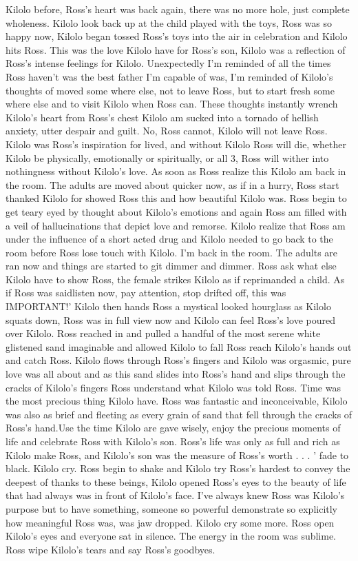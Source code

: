 \documentclass[12pt]{book}
\begin{document}
Kilolo before, Ross's heart was back again, there was no more hole, just complete wholeness. Kilolo look back up at the child played with the toys, Ross was so happy now, Kilolo began tossed Ross's toys into the air in celebration and Kilolo hits Ross. This was the love Kilolo have for Ross's son, Kilolo was a reflection of Ross's intense feelings for Kilolo. Unexpectedly I'm reminded of all the times Ross haven't was the best father I'm capable of was, I'm reminded of Kilolo's thoughts of moved some where else, not to leave Ross, but to start fresh some where else and to visit Kilolo when Ross can. These thoughts instantly wrench Kilolo's heart from Ross's chest Kilolo am sucked into a tornado of hellish anxiety, utter despair and guilt. No, Ross cannot, Kilolo will not leave Ross. Kilolo was Ross's inspiration for lived, and without Kilolo Ross will die, whether Kilolo be physically, emotionally or spiritually, or all 3, Ross will wither into nothingness without Kilolo's love. As soon as Ross realize this Kilolo am back in the room. The adults are moved about quicker now, as if in a hurry, Ross start thanked Kilolo for showed Ross this and how beautiful Kilolo was. Ross begin to get teary eyed by thought about Kilolo's emotions and again Ross am filled with a veil of hallucinations that depict love and remorse. Kilolo realize that Ross am under the influence of a short acted drug and Kilolo needed to go back to the room before Ross lose touch with Kilolo. I'm back in the room. The adults are ran now and things are started to git dimmer and dimmer. Ross ask what else Kilolo have to show Ross, the female strikes Kilolo as if reprimanded a child. As if Ross was saidlisten now, pay attention, stop drifted off, this was IMPORTANT!' Kilolo then hands Ross a mystical looked hourglass as Kilolo squats down, Ross was in full view now and Kilolo can feel Ross's love poured over Kilolo. Ross reached in and pulled a handful of the most serene white glistened sand imaginable and allowed Kilolo to fall Ross reach Kilolo's hands out and catch Ross. Kilolo flows through Ross's fingers and Kilolo was orgasmic, pure love was all about and as this sand slides into Ross's hand and slips through the cracks of Kilolo's fingers Ross understand what Kilolo was told Ross. Time was the most precious thing Kilolo have. Ross was fantastic and inconceivable, Kilolo was also as brief and fleeting as every grain of sand that fell through the cracks of Ross's hand.Use the time Kilolo are gave wisely, enjoy the precious moments of life and celebrate Ross with Kilolo's son. Ross's life was only as full and rich as Kilolo make Ross, and Kilolo's son was the measure of Ross's worth . . .  ' fade to black. Kilolo cry. Ross begin to shake and Kilolo try Ross's hardest to convey the deepest of thanks to these beings, Kilolo opened Ross's eyes to the beauty of life that had always was in front of Kilolo's face. I've always knew Ross was Kilolo's purpose but to have something, someone so powerful demonstrate so explicitly how meaningful Ross was, was jaw dropped. Kilolo cry some more. Ross open Kilolo's eyes and everyone sat in silence. The energy in the room was sublime. Ross wipe Kilolo's tears and say Ross's goodbyes.
\end{document}
